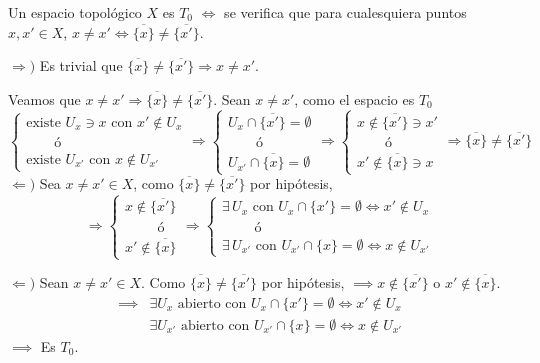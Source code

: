 \begin{prop}
    Un espacio topol\'ogico $X$ es $T_0$ $\iff$ se verifica que para cualesquiera puntos $x,x' \in X$, $x\neq x' \iff \overline{\{x\}} \neq \overline{\{x'\}} $. 
\end{prop}
\begin{dem}
$\Rightarrow) $ Es trivial que $\overline{\{x\}}\neq \overline{\{x'\}} \Rightarrow x\neq x'$. 

Veamos que $x\neq x' \Rightarrow \overline{\{x\}} \neq \overline{\{x'\}}$. Sean $x\neq x'$, como el espacio es $T_0$ 
$$\begin{cases}
\text{existe } U_x \ni x \text{ con } x' \nin U_x \\  \qquad \text{\'o} \\  \text{existe } U_{x'} \text{ con } x \nin U_{x'} 
\end{cases}\Rightarrow \begin{cases}
U_{x} \cap \overline{\{x'\}} = \emptyset  \\ \qquad  \text{\'o} \\  U_{x'} \cap \overline{\{x\}} = \emptyset 
\end{cases} \Rightarrow \begin{cases}
x \nin \overline{\{x'\}} \ni x'  \\ \qquad  \text{\'o} \\  x' \nin \overline{\{x\}} \ni x
\end{cases} \Rightarrow \overline{\{x\}} \neq  \overline{\{x'\}}$$
$\Leftarrow) $ Sea $x\neq x'\in X$, como $\overline{\{x\}} \neq \overline{\{x'\}}$ por hip\'otesis, 
$$\Rightarrow \begin{cases}
    x\nin \overline{\{x'\}} \\ \qquad  \text{ \'o } \\ x' \nin \overline{\{x\}} 
\end{cases} \Rightarrow \begin{cases}
    \exists \, U_x \text{ con } U_x \cap \{x'\} =\emptyset \iff x'\nin U_x \\ 
    \qquad \text{ \'o} \\
    \exists \, U_{x'} \text{ con } U_{x'} \cap \{x\} =\emptyset \iff x \nin U_{x'}
\end{cases}$$

$\Leftarrow)$ Sean $x \ne x' \in X$. Como $\overline{\{x\}} \ne \overline{\{x'\}}$ por hipótesis, $\implies x \notin \overline{\{x'\}}$ o $x' \notin \overline{\{x\}}$.
    \begin{align*}
        \implies & \exists U_x \text{ abierto con } U_x \cap \{x'\} = \emptyset \iff x' \notin U_x \\
        & \exists U_{x'} \text{ abierto con } U_{x'} \cap \{x\} = \emptyset \iff x \notin U_{x'}
    \end{align*}
    $\implies$ Es $T_0$.
\end{dem}
